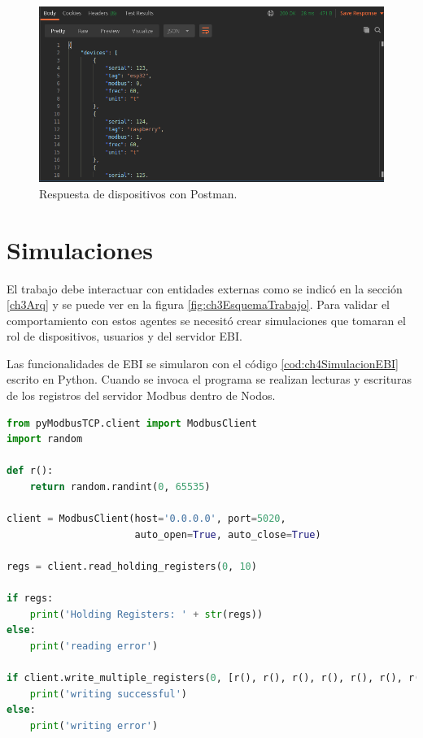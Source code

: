\begin{figure}[h]
	\centering
	\includegraphics[width=\textwidth]{./Figures/postman4.png}
	\caption{Respuesta de dispositivos con Postman.}
	\label{fig:ch4Postman4}
\end{figure}

\section{Simulaciones}
El trabajo debe interactuar con entidades externas como se indicó en la sección \ref{ch3Arq} y se puede ver en la figura \ref{fig:ch3EsquemaTrabajo}.
Para validar el comportamiento con estos agentes se necesitó crear simulaciones que tomaran el rol de dispositivos, usuarios y del servidor EBI.

Las funcionalidades de EBI se simularon con el código \ref{cod:ch4SimulacionEBI} escrito en Python.
Cuando se invoca el programa se realizan lecturas y escrituras de los registros del servidor Modbus dentro de Nodos.

\begin{lstlisting}[language=python,label=cod:ch4SimulacionEBI,caption=Simulación de EBI.]
from pyModbusTCP.client import ModbusClient
import random

def r():
    return random.randint(0, 65535)

client = ModbusClient(host='0.0.0.0', port=5020,
                      auto_open=True, auto_close=True)

regs = client.read_holding_registers(0, 10)

if regs:
    print('Holding Registers: ' + str(regs))
else:
    print('reading error')

if client.write_multiple_registers(0, [r(), r(), r(), r(), r(), r(), r(), r(), r(), r()]):
    print('writing successful')
else:
    print('writing error')
\end{lstlisting}

